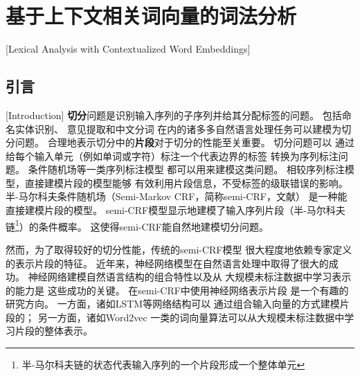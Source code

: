 \chapter{基于上下文相关词向量的词法分析}[Lexical Analysis with Contextualized Word Embeddings]\label{chp:semicrf}

\section{引言}[Introduction]
\textbf{切分}问题是识别输入序列的子序列并给其分配标签的问题。
包括命名实体识别\cite{okanohara-EtAl:2006:COLACL}、
意见提取\cite{yang-cardie:2012:EMNLP-CoNLL}和中文分词\cite{andrew:2006:EMNLP}
在内的诸多多自然语言处理任务可以建模为切分问题。
合理地表示切分中的\textbf{片段}对于切分的性能至关重要。
切分问题可以
通过给每个输入单元（例如单词或字符）标注一个代表边界的标签
转换为序列标注问题。
条件随机场\cite{Lafferty:2001:CRF:645530.655813}等一类序列标注模型
都可以用来建模这类问题。
相较序列标注模型，直接建模片段的模型能够
有效利用片段信息，不受标签的级联错误的影响。
半-马尔科夫条件随机场（Semi-Markov CRF，简称semi-CRF，文献）
是一种能直接建模片段的模型。
semi-CRF模型显示地建模了输入序列片段（半-马尔科夫链\footnote{半-马尔科夫链的状态代表输入序列的一个片段形成一个整体单元}）的条件概率。
这使得semi-CRF能自然地建模切分问题。

然而，为了取得较好的切分性能，传统的semi-CRF模型
很大程度地依赖专家定义的表示片段的特征。
近年来，神经网络模型在自然语言处理中取得了很大的成功。
神经网络建模自然语言结构的组合特性以及从
大规模未标注数据中学习表示的能力是
这些成功的关键。
在semi-CRF中使用神经网络表示片段
是一个有趣的研究方向。
一方面，诸如LSTM\cite{Hochreiter:1997:LSM:1246443.1246450}等网络结构可以
通过组合输入向量的方式建模片段的；
另一方面，诸如Word2vec\cite{NIPS2013_5021}
一类的词向量算法可以从大规模未标注数据中学习片段的整体表示。


